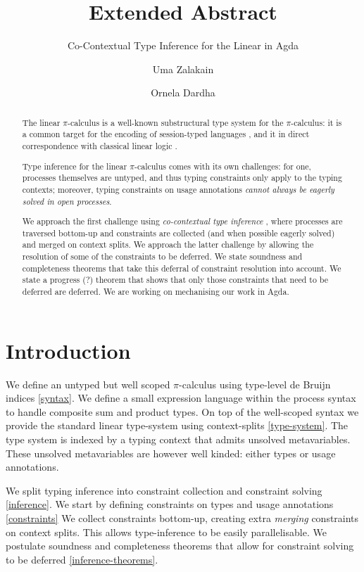 \documentclass[sigplan,screen,review]{acmart}
\title{Extended Abstract}
\subtitle{Co-Contextual Type Inference for the Linear \Picalc{} in Agda}
\author{Uma Zalakain}
\affiliation{University of Glasgow}
\author{Ornela Dardha}
\affiliation{University of Glasgow}
\newcommand{\picalc}{$\pi$-calculus}
\begin{document}
\begin{abstract}
  The linear \picalc{} is a well-known substructural type system for the \picalc{}:
  it is a common target for the encoding of session-typed languages \cite{DardhaGS17},
  and it in direct correspondence with classical linear logic .

  Type inference for the linear \picalc{} comes with its own challenges:
  for one, processes themselves are untyped, and thus typing constraints only apply to the typing contexts;
  moreover, typing constraints on usage annotations \emph{cannot always be eagerly solved in open processes}.

  We approach the first challenge using \emph{co-contextual type inference} \cite{ErdwegBKKM15}, where processes are traversed bottom-up and constraints are collected (and when possible eagerly solved) and merged on context splits.
  We approach the latter challenge by allowing the resolution of some of the constraints to be deferred.
  We state soundness and completeness theorems that take this deferral of constraint resolution into account.
  We state a progress (?) theorem that shows that only those constraints that need to be deferred are deferred.
  We are working on mechanising our work in Agda.
\end{abstract}


\maketitle

\section{Introduction}\label{introduction}

We define an untyped but well scoped \picalc{} using type-level de Bruijn \cite{deBruijn72} indices \autoref{syntax}.
We define a small expression language within the process syntax to handle composite sum and product types.
On top of the well-scoped syntax we provide the standard linear type-system using context-splits \autoref{type-system}.
The type system is indexed by a typing context that admits unsolved metavariables.
These unsolved metavariables are however well kinded: either types or usage annotations.


We split typing inference into constraint collection and constraint solving \autoref{inference}.
We start by defining constraints on types and usage annotations \autoref{constraints}
We collect constraints bottom-up, creating extra \emph{merging} constraints on context splits.
This allows type-inference to be easily parallelisable.
We postulate soundness and completeness theorems that allow for constraint solving to be deferred \autoref{inference-theorems}.
\end{document}
